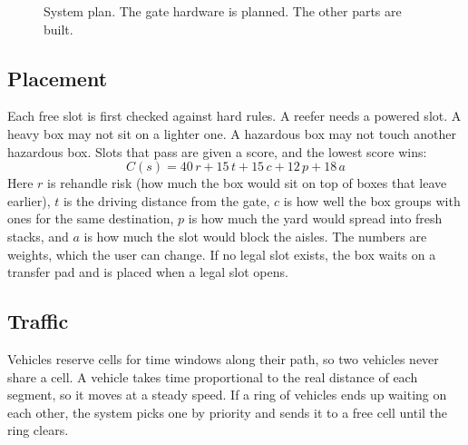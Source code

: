 \documentclass[conference]{IEEEtran}
\begin{document}
\begin{figure}[t]
\centering
{}
\caption{System plan. The gate hardware is planned. The other parts are built.}
\label{fig:arch}
\end{figure}

\subsection{Placement}
Each free slot is first checked against hard rules. A reefer needs a powered slot. A heavy box may not sit on a lighter one. A hazardous box may not touch another hazardous box. Slots that pass are given a score, and the lowest score wins:
\begin{equation}
C(s)=40\,r+15\,t+15\,c+12\,p+18\,a
\end{equation}
Here $r$ is rehandle risk (how much the box would sit on top of boxes that leave earlier), $t$ is the driving distance from the gate, $c$ is how well the box groups with ones for the same destination, $p$ is how much the yard would spread into fresh stacks, and $a$ is how much the slot would block the aisles. The numbers are weights, which the user can change. If no legal slot exists, the box waits on a transfer pad and is placed when a legal slot opens.

\subsection{Traffic}
Vehicles reserve cells for time windows along their path, so two vehicles never share a cell. A vehicle takes time proportional to the real distance of each segment, so it moves at a steady speed. If a ring of vehicles ends up waiting on each other, the system picks one by priority and sends it to a free cell until the ring clears.
\end{document}
